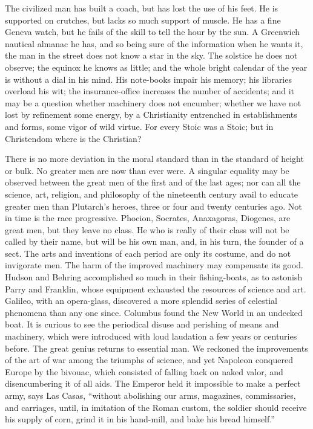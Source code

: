 \documentclass{article}
\begin{document}
The civilized man has built a coach, but has lost the use of his feet. He is
supported on crutches, but lacks so much support of muscle. He has a fine
Geneva watch, but he fails of the skill to tell the hour by the sun. A
Greenwich nautical almanac he has, and so being sure of the information when
he wants it, the man in the street does not know a star in the sky. The
solstice he does not observe; the equinox he knows as little; and the whole
bright calendar of the year is without a dial in his mind. His note-books
impair his memory; his libraries overload his wit; the insurance-office
increases the number of accidents; and it may be a question whether
machinery does not encumber; whether we have not lost by refinement some
energy, by a Christianity entrenched in establishments and forms, some vigor
of wild virtue. For every Stoic was a Stoic; but in Christendom where is the
Christian?

There is no more deviation in the moral standard than in the standard of
height or bulk. No greater men are now than ever were. A singular equality
may be observed between the great men of the first and of the last ages; nor
can all the science, art, religion, and philosophy of the nineteenth century
avail to educate greater men than Plutarch's heroes, three or four and
twenty centuries ago. Not in time is the race progressive. Phocion,
Socrates, Anaxagoras, Diogenes, are great men, but they leave no class. He
who is really of their class will not be called by their name, but will be
his own man, and, in his turn, the founder of a sect. The arts and
inventions of each period are only its costume, and do not invigorate men.
The harm of the improved machinery may compensate its good. Hudson and
Behring accomplished so much in their fishing-boats, as to astonish Parry
and Franklin, whose equipment exhausted the resources of science and art.
Galileo, with an opera-glass, discovered a more splendid series of celestial
phenomena than any one since. Columbus found the New World in an undecked
boat. It is curious to see the periodical disuse and perishing of means and
machinery, which were introduced with loud laudation a few years or
centuries before. The great genius returns to essential man. We reckoned the
improvements of the art of war among the triumphs of science, and yet
Napoleon conquered Europe by the bivouac, which consisted of falling back on
naked valor, and disencumbering it of all aids. The Emperor held it
impossible to make a perfect army, says Las Casas, ``without abolishing our
arms, magazines, commissaries, and carriages, until, in imitation of the
Roman custom, the soldier should receive his supply of corn, grind it in his
hand-mill, and bake his bread himself.''
\end{document}
